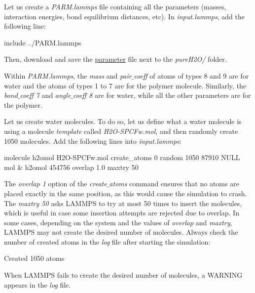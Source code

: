 \noindent Let us create a \textit{PARM.lammps} file containing all the
parameters (masses, interaction energies, bond equilibrium
distances, etc). In \textit{input.lammps}, add the following line:

\begin{lcverbatim}
include ../PARM.lammps
\end{lcverbatim}

\noindent Then, download and save the \href{https://lammpstutorials.github.io/lammpstutorials-inputs/level2/polymer-in-water/PARM.lammps}{parameter} file
next to the \textit{pureH2O/} folder.

\vspace{0.25cm} \noindent Within \textit{PARM.lammps}, the \textit{mass} and \textit{pair$\_$coeff} of atoms
of types 8 and 9 are for water and the 
atoms of types 1 to 7 are for the polymer
molecule. Similarly, the \textit{bond$\_$coeff 7} and 
\textit{angle$\_$coeff 8} are for water, while all
the other parameters are for the polymer.

\vspace{0.25cm} \noindent Let us create water molecules. To do so, let us
define what a water molecule is using a molecule \textit{template} called
\textit{H2O-SPCFw.mol}, and then randomly create 1050 molecules.
Add the following lines into \textit{input.lammps}:

\begin{lcverbatim}
molecule h2omol H2O-SPCFw.mol
create_atoms 0 random 1050 87910 NULL mol &
    h2omol 454756 overlap 1.0 maxtry 50
\end{lcverbatim}

\noindent The \textit{overlap 1} option of the \textit{create$\_$atoms} command ensures that no atoms are
placed exactly in the same position, as this would cause the simulation to
crash. The \textit{maxtry 50} asks LAMMPS to try at most
50 times to insert the molecules, which is useful in case some
insertion attempts are rejected due to overlap. In some cases, depending on
the system and the values of \textit{overlap}
and \textit{maxtry}, LAMMPS may not create the desired number of molecules.
Always check the number of created atoms in the \textit{log} file after
starting the simulation:

\begin{lcverbatim}
Created 1050 atoms
\end{lcverbatim}

\noindent When LAMMPS fails to create the desired number of molecules, a WARNING
appears in the \textit{log} file.

